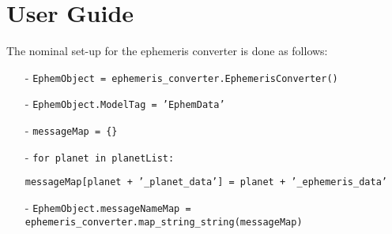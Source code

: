 \section{User Guide}

The nominal set-up for the ephemeris converter is done as follows:

\begin{itemize}
\item[-]     \texttt{EphemObject = ephemeris\_converter.EphemerisConverter()}
\item[-]     \texttt{EphemObject.ModelTag = 'EphemData'}
\item[-]     \texttt{messageMap = \{\}}
\item[-]  \texttt{for planet in planetList:}

\hspace{2cm}   \texttt{messageMap[planet + '\_planet\_data'] = planet + '\_ephemeris\_data'}

\item[-]   \texttt{EphemObject.messageNameMap = ephemeris\_converter.map\_string\_string(messageMap)}
\end{itemize}